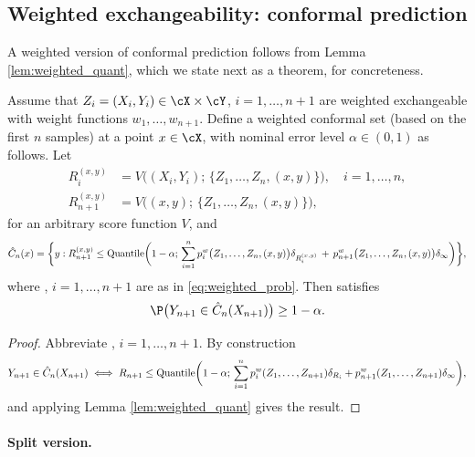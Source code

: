 \documentclass{article}
\begin{document}
\subsection{Weighted exchangeability: conformal prediction}

\def\hC{\hat{C}}

A weighted version of conformal prediction follows from Lemma
\ref{lem:weighted_quant}, which we state next as a theorem, for concreteness. 

\begin{theorem}
\label{thm:weighted_conf}
Assume that $Z_i=(X_i,Y_i) \in \cX \times \cY$, $i=1,\dots,n+1$ are weighted   
exchangeable with weight functions $w_1,\dots,w_{n+1}$. Define a weighted
conformal set (based on the first $n$ samples) at a point $x \in \cX$, with
nominal error level $\alpha \in (0,1)$ as follows. Let   
\begin{equation}
\label{eq:scores}
\begin{aligned}
R_i^{(x,y)} &= V\Big( (X_i,Y_i); \, \{Z_1,\dots,Z_n,(x,y)\} \Big), \quad
  i=1,\dots,n, \\ 
R_{n+1}^{(x,y)} &= V\Big( (x,y); \, \{Z_1,\dots,Z_n,(x,y)\} \Big), 
\end{aligned}
\end{equation}
for an arbitrary score function $V$, and
\begin{equation}
\label{eq:weighted_conf}
\hC_n(x) = \bigg\{ y : R_{n+1}^{(x,y)} \leq \Quantile\bigg( 1-\alpha; 
\, \sum_{i=1}^n p^w_i\big( Z_1,\dots,Z_n,(x,y) \big) \delta_{R_i^{(x,y)}} \,+\, 
p^w_{n+1}\big( Z_1,\dots,Z_n,(x,y) \big) \delta_\infty \bigg) \bigg\},  
\end{equation}
where , $i=1,\dots,n+1$ are as in \eqref{eq:weighted_prob}.  
Then \smash{$\hC_n$} satisfies    
\begin{equation}
\label{eq:weighted_cov}
\P\big( Y_{n+1} \in \hC_n(X_{n+1}) \big) \geq 1-\alpha.  
\end{equation}
\end{theorem}

\begin{proof}
Abbreviate , $i=1,\dots,n+1$. By
construction 
\[
Y_{n+1} \in \hC_n(X_{n+1}) \iff 
R_{n+1} \leq \Quantile\bigg( 1-\alpha; \, \sum_{i=1}^n p^w_i(Z_1,\dots,Z_{n+1}) 
\delta_{R_i} + p^w_{n+1}(Z_1,\dots,Z_{n+1}) \delta_\infty \bigg),
\]
and applying Lemma \ref{lem:weighted_quant} gives the result.  
\end{proof}

\paragraph{Split version.}
\end{document}

